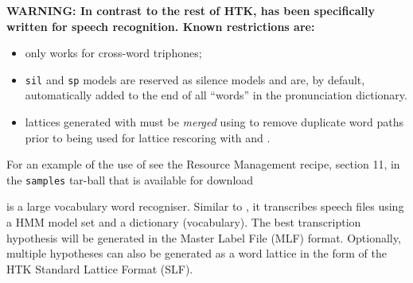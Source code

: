 
%
%
\newpage
{}

{\bf\large WARNING: In contrast to the rest of HTK,  has
been specifically written for speech recognition. Known restrictions
are:
\begin{itemize}
\item only works for cross-word triphones;
\item \texttt{sil} and \texttt{sp} models are reserved as silence
models and are, by default, automatically added to the end of all
``words'' in the pronunciation dictionary.
\item lattices generated with  must be {\em merged} 
using 
to remove duplicate word paths prior to being used for lattice rescoring
with  and .
\end{itemize}
For an example of the use of  see the Resource
Management recipe, section 11, in the \texttt{samples} tar-ball
that is available for download
}


 is a large vocabulary word recogniser.  
Similar to , it transcribes speech files using a HMM model set
and a dictionary (vocabulary). The best transcription hypothesis will be
generated in the Master Label File (MLF) format. Optionally,
multiple hypotheses can also be generated as a word lattice in the form
of the HTK Standard Lattice Format (SLF).

